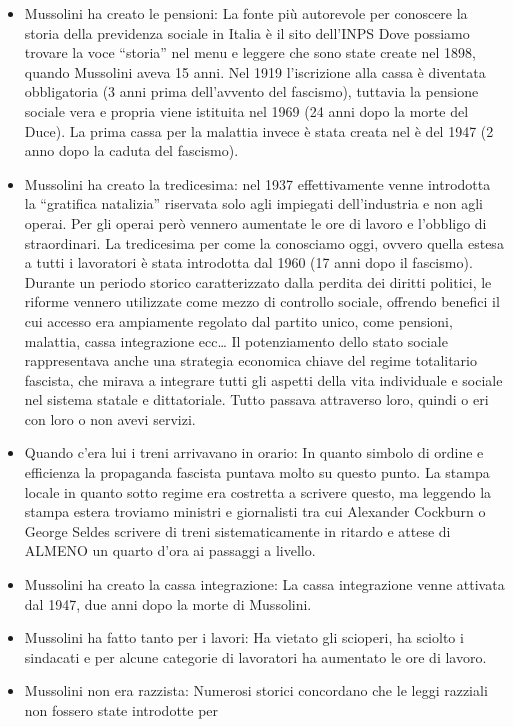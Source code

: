 \documentclass[12pt]{book} %
\begin{document}
\begin{mdframed}[linewidth=1pt]
\begin{itemize}
\item Mussolini ha creato le pensioni: La fonte più autorevole per conoscere la storia della previdenza sociale in
Italia è il sito dell'INPS Dove possiamo trovare la voce “storia”
nel menu e leggere che sono state create nel 1898, quando Mussolini aveva 15 anni. Nel 1919
l'iscrizione alla cassa è diventata obbligatoria (3 anni prima dell'avvento
del fascismo), tuttavia la pensione sociale vera e propria viene istituita nel 1969 (24 anni dopo la morte del Duce).
La prima cassa per la malattia invece è stata creata nel è del 1947 (2 anno dopo la caduta del fascismo).
\item Mussolini ha creato la tredicesima: nel 1937 effettivamente venne introdotta la “gratifica natalizia” riservata
solo agli impiegati dell'industria e non agli operai. Per gli operai però vennero aumentate le ore
di lavoro e l'obbligo di straordinari. La tredicesima per come la conosciamo oggi, ovvero quella
estesa a tutti i lavoratori è stata introdotta dal 1960 (17 anni dopo il fascismo).
Durante un periodo storico caratterizzato dalla perdita dei diritti politici, le riforme vennero utilizzate come mezzo di controllo sociale, offrendo benefici il cui accesso era ampiamente regolato dal partito unico, come pensioni, malattia, cassa integrazione ecc… Il potenziamento dello stato sociale rappresentava anche una strategia economica chiave del regime totalitario fascista, che mirava a integrare tutti gli aspetti della vita individuale e sociale nel sistema statale e dittatoriale. Tutto passava attraverso loro, quindi o eri con loro o non avevi servizi.
\item Quando c'era lui i treni arrivavano in orario: In quanto simbolo di ordine e efficienza la
propaganda fascista puntava molto su questo punto. La stampa locale in quanto sotto regime era costretta a scrivere
questo, ma leggendo la stampa estera troviamo ministri e giornalisti tra cui Alexander Cockburn o George Seldes
scrivere di treni sistematicamente in ritardo e attese di ALMENO un quarto d'ora ai passaggi a
livello.
\item Mussolini ha creato la cassa integrazione: La cassa integrazione venne attivata dal 1947, due anni dopo la morte
di Mussolini.
\item Mussolini ha fatto tanto per i lavori: Ha vietato gli scioperi, ha sciolto i sindacati e per alcune categorie di
lavoratori ha aumentato le ore di lavoro.
\item Mussolini non era razzista: Numerosi storici concordano che le leggi razziali non fossero state introdotte per

\end{itemize}
\end{mdframed}
\end{document}
